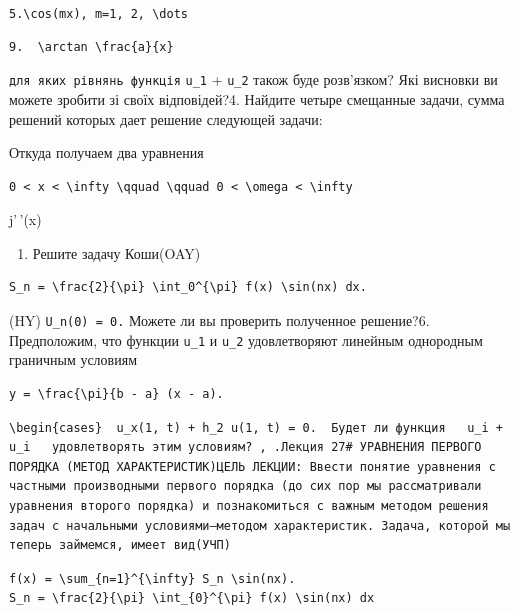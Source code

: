 \documentclass[
  ukrainian,
]{article}
\providecommand{\tightlist}{%
  \setlength{\itemsep}{0pt}\setlength{\parskip}{0pt}}
\begin{document}
\texttt{\textquotesingle{}5.\textquotesingle{}\textbackslash{}cos(mx),\ m=1,\ 2,\ \textbackslash{}dots}

\begin{verbatim}
9.  \arctan \frac{a}{x}
\end{verbatim}

\mathbf{\Pi} \texttt{для\ яких\ рівнянь\ функція} \texttt{u\_1} +
\texttt{u\_2} також буде розв'язком? Які висновки ви можете зробити зі
своїх відповідей?4. Найдите четыре смещанные задачи, сумма решений
которых дает решение следующей задачи:

Откуда получаем два уравнения

\begin{verbatim}
0 < x < \infty \qquad \qquad 0 < \omega < \infty
\end{verbatim}

j'\,'(x)

\begin{enumerate}
\def\labelenumi{\arabic{enumi}.}
\setcounter{enumi}{4}
\tightlist
\item
  Решите задачу Коши(OAY)
\end{enumerate}

\begin{verbatim}
S_n = \frac{2}{\pi} \int_0^{\pi} f(x) \sin(nx) dx.
\end{verbatim}

(HY) \texttt{U\_n(0)\ =\ 0.} Можете ли вы проверить полученное
решение?6. Предположим, что функции \texttt{u\_1} и \texttt{u\_2}
удовлетворяют линейным однородным граничным условиям

\begin{verbatim}
y = \frac{\pi}{b - a} (x - a).
\end{verbatim}

\begin{verbatim}
\begin{cases}  u_x(1, t) + h_2 u(1, t) = 0.  Будет ли функция   u_i + u_i   удовлетворять этим условиям? , .Лекция 27# УРАВНЕНИЯ ПЕРВОГО ПОРЯДКА (МЕТОД ХАРАКТЕРИСТИК)ЦЕЛЬ ЛЕКЦИИ: Ввести понятие уравнения с частными производными первого порядка (до сих пор мы рассматривали уравнения второго порядка) и познакомиться с важным методом решения задач с начальными условиями—методом характеристик. Задача, которой мы теперь займемся, имеет вид(УЧП)
\end{verbatim}

\begin{verbatim}
f(x) = \sum_{n=1}^{\infty} S_n \sin(nx).
S_n = \frac{2}{\pi} \int_{0}^{\pi} f(x) \sin(nx) dx
\end{verbatim}
\end{document}
